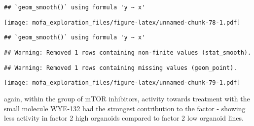 \documentclass[
]{article}
\newenvironment{Shaded}{\begin{snugshade}}{\end{snugshade}}
\newcommand{\DataTypeTok}[1]{\textcolor[rgb]{0.13,0.29,0.53}{#1}}
\newcommand{\KeywordTok}[1]{\textcolor[rgb]{0.13,0.29,0.53}{\textbf{#1}}}
\newcommand{\NormalTok}[1]{#1}
\newcommand{\OperatorTok}[1]{\textcolor[rgb]{0.81,0.36,0.00}{\textbf{#1}}}
\newcommand{\OtherTok}[1]{\textcolor[rgb]{0.56,0.35,0.01}{#1}}
\newcommand{\StringTok}[1]{\textcolor[rgb]{0.31,0.60,0.02}{#1}}
\begin{document}
\begin{verbatim}
## `geom_smooth()` using formula 'y ~ x'
\end{verbatim}

\texttt{[image: mofa\_exploration\_files/figure-latex/unnamed-chunk-78-1.pdf]}

\begin{Shaded}
\end{Shaded}

\begin{verbatim}
## `geom_smooth()` using formula 'y ~ x'
\end{verbatim}

\begin{verbatim}
## Warning: Removed 1 rows containing non-finite values (stat_smooth).
\end{verbatim}

\begin{verbatim}
## Warning: Removed 1 rows containing missing values (geom_point).
\end{verbatim}

\texttt{[image: mofa\_exploration\_files/figure-latex/unnamed-chunk-79-1.pdf]}

again, within the group of mTOR inhibitors, activity towards treatment
with the small molecule WYE-132 had the strongest contribution to the
factor - showing less activity in factor 2 high organoids compared to
factor 2 low organoid lines.
\end{document}
